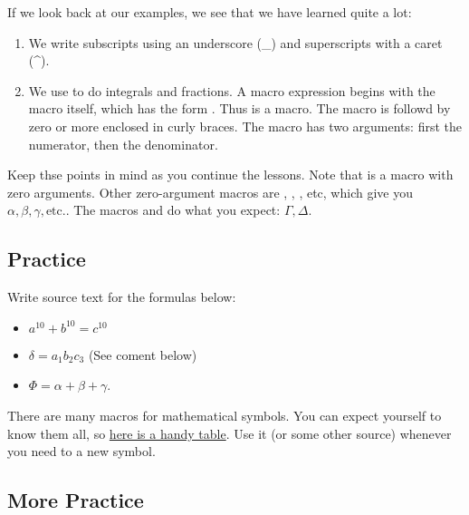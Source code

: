 If we look back at our examples, we see that we have learned quite a lot:

\begin{enumerate}

\item We write subscripts using an underscore (_) and superscripts with a caret (^).

\item We use  to do integrals and fractions.  A macro expression begins with the macro itself, which has the form .  Thus  is a macro.  The macro is followd by zero or more  enclosed in curly braces.  The  macro has two arguments: first the numerator, then the denominator.

\end{enumerate}

Keep thse points in mind as you continue the lessons.  Note that  is a macro with zero arguments.  Other zero-argument macros are , , , etc, which give you $\alpha, \beta, \gamma, \text{etc.}$.  The macros  and  do what you expect: $\Gamma, \Delta$.

\subsection{Practice}

Write source text for the formulas below:

\begin{itemize}

\item $ a^{10} + b^{10} = c^{10} $

\item $ \delta = a_1b_2c_3 $ (See coment below)

\item $\Phi = \alpha + \beta + \gamma$.

\end{itemize}

There are many macros for mathematical symbols.  You can expect yourself to know them all, so \href{https://katex.org/docs/supported.html}{here is a handy table}.  Use it (or some other source) whenever you need to a new symbol.

\subsection{More Practice}

